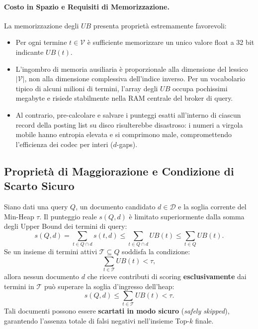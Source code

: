 \paragraph{Costo in Spazio e Requisiti di Memorizzazione.}
La memorizzazione degli $UB$ presenta propriet\`a estremamente favorevoli:
\begin{itemize}
    \item Per ogni termine $t \in \mathcal{V}$ \`e sufficiente memorizzare un unico valore float a 32 bit indicante $UB(t)$.
    \item L'ingombro di memoria ausiliaria \`e proporzionale alla dimensione del lessico $|\mathcal{V}|$, non alla dimensione complessiva dell'indice inverso. Per un vocabolario tipico di alcuni milioni di termini, l'array degli $UB$ occupa pochissimi megabyte e risiede stabilmente nella RAM centrale del broker di query.
    \item Al contrario, pre-calcolare e salvare i punteggi esatti all'interno di ciascun record della posting list su disco risulterebbe disastroso: i numeri a virgola mobile hanno entropia elevata e si comprimono male, compromettendo l'efficienza dei codec per interi ($d$-gaps).
\end{itemize}

\FloatBarrier
\subsection{Propriet\`a di Maggiorazione e Condizione di Scarto Sicuro}
\begin{theorem}
\label{thm:wand-safe-skipping}
Siano dati una query $Q$, un documento candidato $d \in \mathcal{D}$ e la soglia corrente del Min-Heap $\tau$. Il punteggio reale $s(Q, d)$ \`e limitato superiormente dalla somma degli Upper Bound dei termini di query:
\begin{equation}
    s(Q, d) = \sum_{t \in Q \cap d} s(t, d) \le \sum_{t \in Q \cap d} UB(t) \le \sum_{t \in Q} UB(t).
    \label{eq:maggiorazione-wand}
\end{equation}
Se un insieme di termini attivi $\mathcal{T} \subseteq Q$ soddisfa la condizione:
\begin{equation}
    \sum_{t \in \mathcal{T}} UB(t) < \tau,
    \label{eq:scarto-sicuro}
\end{equation}
allora nessun documento $d$ che riceve contributi di scoring \textbf{esclusivamente} dai termini in $\mathcal{T}$ pu\`o superare la soglia d'ingresso dell'heap:
\begin{equation}
    s(Q, d) \le \sum_{t \in \mathcal{T}} UB(t) < \tau.
\end{equation}
Tali documenti possono essere \textbf{scartati in modo sicuro} (\textit{safely skipped}), garantendo l'assenza totale di falsi negativi nell'insieme Top-$k$ finale.
\end{theorem}

